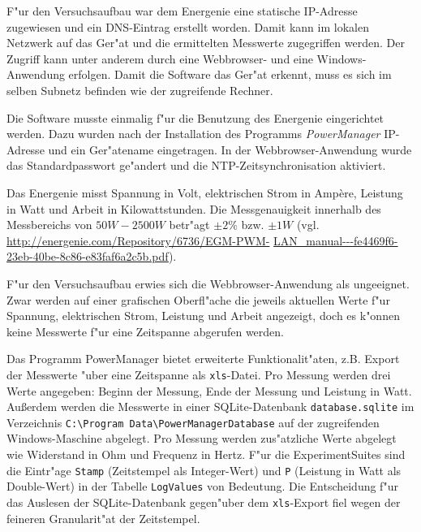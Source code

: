 {%
F"ur den Versuchsaufbau war dem Energenie eine statische IP-Adresse zugewiesen und ein DNS-Eintrag erstellt worden. Damit kann im lokalen Netzwerk auf das Ger"at und die ermittelten Messwerte zugegriffen werden. Der Zugriff kann unter anderem durch eine Webbrowser- und eine Windows-Anwendung erfolgen. Damit die Software das Ger"at erkennt, muss es sich im selben Subnetz befinden wie der zugreifende Rechner. 

Die Software musste einmalig f"ur die Benutzung des Energenie eingerichtet werden. Dazu wurden nach der Installation des Programms \textit{PowerManager} IP-Adresse und ein Ger"atename eingetragen. In der Webbrowser-Anwendung wurde das Standardpasswort ge"andert und die NTP-Zeitsynchronisation aktiviert. 

\noindent
Das Energenie misst Spannung in Volt, elektrischen Strom in Amp\`{e}re, Leistung in Watt und Arbeit in Kilowattstunden. Die Messgenauigkeit innerhalb des Messbereichs von $50 W - 2500 W$ betr"agt $\pm 2\%$ bzw. $\pm 1 W$ (vgl. \url{http://energenie.com/Repository/6736/EGM-PWM-} \url{LAN_manual---fe4469f6-23eb-40be-8c86-e83faf6a2c5b.pdf}). %

F"ur den Versuchsaufbau erwies sich die Webbrowser-Anwendung als ungeeignet. Zwar werden auf einer grafischen Oberfl"ache die jeweils aktuellen Werte f"ur Spannung, elektrischen Strom, Leistung und Arbeit angezeigt, doch es k"onnen keine Messwerte f"ur eine Zeitspanne abgerufen werden. 

Das Programm PowerManager bietet erweiterte Funktionalit"aten, z.B. Export der Messwerte "uber eine Zeitspanne als \texttt{xls}-Datei. Pro Messung werden drei Werte angegeben: Beginn der Messung, Ende der Messung und Leistung in Watt. Au\ss erdem werden die Messwerte in einer SQLite-Datenbank \texttt{database.sqlite} im Verzeichnis \texttt{C:\textbackslash Program Data\textbackslash PowerManagerData\-base} auf der zugreifenden Windows-Maschine abgelegt. Pro Messung werden zus"atzliche Werte abgelegt wie Widerstand in Ohm und Frequenz in Hertz. F"ur die ExperimentSuites sind die Eintr"age \texttt{Stamp} (Zeitstempel als Integer-Wert) und \texttt{P} (Leistung in Watt als Double-Wert) in der Tabelle \texttt{LogValues} von Bedeutung. Die Entscheidung f"ur das Auslesen der SQLite-Datenbank gegen"uber dem \texttt{xls}-Export fiel wegen der feineren Granularit"at der Zeitstempel. 

}
